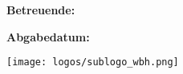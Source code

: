 \begin{titlepage}

    \vfil

    \hspace{1cm}
    \begin{minipage}{\dimexpr\textwidth-1.5cm\relax}
        {\Large\textsf{
            }}

        \vspace{0.5cm}

        {\Large\textsf{
            \textbf{Betreuende:}
        }}

        \vspace{0.5cm}

        {\Large\textsf{
            \textbf{Abgabedatum:} \\\documentDate
        }}
    \end{minipage}

    \vfil


    \enlargethispage{5\baselineskip}

    \texttt{[image: logos/sublogo\_wbh.png]}


\end{titlepage}

\restoregeometry